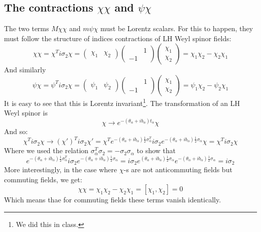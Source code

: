 \documentclass{article}
\begin{document}
\subsection{The contractions $\chi\chi$ and $\psi\chi$}
The two terms $M\chi\chi$ and $m\psi\chi$ must be Lorentz scalars. For this to happen, they must follow the structure of indices contractions of LH Weyl spinor fields:
\begin{equation}
    \chi\chi = \chi^T i\sigma_2 \chi = \begin{pmatrix} \chi_1 & \chi_2 \end{pmatrix} \begin{pmatrix} & 1 \\ -1 & \end{pmatrix} \begin{pmatrix} \chi_1 \\ \chi_2 \end{pmatrix} = \chi_1\chi_2 - \chi_2\chi_1
\end{equation}
And similarly
\begin{equation}
    \psi\chi = \psi^T i\sigma_2 \chi = \begin{pmatrix} \psi_1 & \psi_2 \end{pmatrix} \begin{pmatrix} & 1 \\ -1 & \end{pmatrix} \begin{pmatrix} \chi_1 \\ \chi_2 \end{pmatrix} = \psi_1\chi_2 - \psi_2\chi_1
\end{equation}
It is easy to see that this is Lorentz invariant\footnote{We did this in class.}. The transformation of an LH Weyl spinor is
\begin{equation}
    \chi \rightarrow e^{-(\theta_\alpha + ib_\alpha)t_\alpha}\chi
\end{equation}
And so:
\begin{equation}
    \chi^T i\sigma_2 \chi \rightarrow (\chi')^T i\sigma_2 \chi' = \chi^T e^{-(\theta_\alpha + ib_\alpha)\frac{1}{2}\sigma^T_\alpha} i\sigma_2 e^{-(\theta_\alpha + ib_\alpha)\frac{1}{2}\sigma_\alpha} \chi = \chi^T i\sigma_2 \chi
\end{equation}
Where we used the relation $\sigma_\alpha^T\sigma_2 = -\sigma_2\sigma_\alpha$ to show that
\begin{equation}
    e^{-(\theta_\alpha + ib_\alpha)\frac{1}{2}\sigma^T_\alpha} i\sigma_2 e^{-(\theta_\alpha + ib_\alpha)\frac{1}{2}\sigma_\alpha} = i\sigma_2 e^{(\theta_\alpha + ib_\alpha)\frac{1}{2}\sigma_\alpha} e^{-(\theta_\alpha + ib_\alpha)\frac{1}{2}\sigma_\alpha} = i\sigma_2
\end{equation}
More interestingly, in the case where $\chi$-s are not anticommuting fields but commuting fields, we get:
\begin{equation}
    \chi\chi = \chi_1\chi_2 - \chi_2\chi_1 = [\chi_1, \chi_2] = 0
\end{equation}
Which means thae for commuting fields these terms vanish identically.
\end{document}
